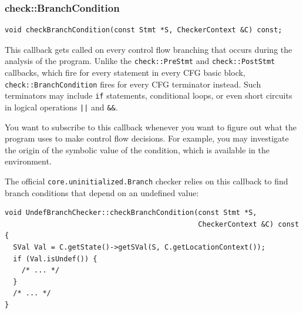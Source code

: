 \documentclass[a4paper,12pt]{article}
\newenvironment{nobr}{\begin{minipage}{\textwidth}\setlength\parskip{1em}
}{\end{minipage}\ignorespacesafterend}
\begin{document}
\begin{nobr}
\subsubsection{check::BranchCondition}

\begin{lstlisting}[style=cplusplus,numbers=none]
void checkBranchCondition(const Stmt *S, CheckerContext &C) const;
\end{lstlisting}

This callback gets called on every control flow branching that occurs during the analysis of the program. Unlike the \lstinline|check::PreStmt| and \lstinline|check::PostStmt| callbacks, which fire for every statement in every CFG basic block, \lstinline|check::BranchCondition| fires for every CFG terminator instead. Such terminators may include \lstinline|if| statements, conditional loops, or even short circuits in logical operations \lstinline$||$ and \lstinline|&&|.
\end{nobr}

You want to subscribe to this callback whenever you want to figure out what the program uses to make control flow decisions. For example, you may investigate the origin of the symbolic value of the condition, which is available in the environment.

\begin{nobr}
The official \lstinline|core.uninitialized.Branch| checker relies on this callback to find branch conditions that depend on an undefined value:

\begin{lstlisting}[style=cplusplus]
void UndefBranchChecker::checkBranchCondition(const Stmt *S,
                                              CheckerContext &C) const {
  SVal Val = C.getState()->getSVal(S, C.getLocationContext());
  if (Val.isUndef()) {
    /* ... */
  }
  /* ... */
}
\end{lstlisting}
\end{nobr}
\end{document}
